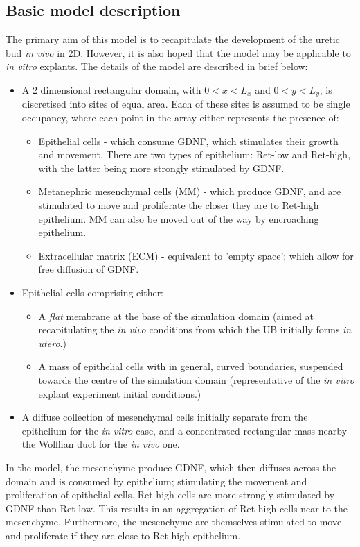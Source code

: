 \documentclass[pdftex,10pt,a4paper,twocolumn]{article}
\begin{document}
\subsection{Basic model description}
The primary aim of this model is to recapitulate the development of the uretic bud \textit{in vivo} in 2D. However, it is also hoped that the model may be applicable to \textit{in vitro} explants. The details of the model are described in brief below:
\begin{itemize}
\item A 2 dimensional rectangular domain, with $0<x<L_x$ and $0<y<L_y$, is discretised into sites of equal area. Each of these sites is assumed to be single occupancy, where each point in the array either represents the presence of:
\begin{itemize}
\item Epithelial cells - which consume GDNF, which stimulates their growth and movement. There are two types of epithelium: Ret-low and Ret-high, with the latter being more strongly stimulated by GDNF. 
\item Metanephric mesenchymal cells (MM) - which produce GDNF, and are stimulated to move and proliferate the closer they are to Ret-high epithelium. MM can also be moved out of the way by encroaching epithelium.
\item Extracellular matrix (ECM) - equivalent to 'empty space'; which allow for free diffusion of GDNF.
\end{itemize}
\item Epithelial cells comprising either:
\begin{itemize}
\item A \textit{flat} membrane at the base of the simulation domain (aimed at recapitulating the \textit{in vivo} conditions from which the UB initially forms \textit{in utero}.)
\item A mass of epithelial cells with in general, curved boundaries, suspended towards the centre of the simulation domain (representative of the \textit{in vitro} explant experiment initial conditions.)
\end{itemize}
\item A diffuse collection of mesenchymal cells initially separate from the epithelium for the \textit{in vitro} case, and a concentrated rectangular mass nearby the Wolffian duct for the \textit{in vivo} one.
\end{itemize}

In the model, the mesenchyme produce GDNF, which then diffuses across the domain and is consumed by epithelium; stimulating the movement and proliferation of epithelial cells. Ret-high cells are more strongly stimulated by GDNF than Ret-low. This results in an aggregation of Ret-high cells near to the mesenchyme. Furthermore, the mesenchyme are themselves stimulated to move and proliferate if they are close to Ret-high epithelium.
\end{document}
